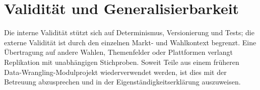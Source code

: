 \section{Validität und Generalisierbarkeit}
Die interne Validität stützt sich auf Determinismus, Versionierung und Tests; die
externe Validität ist durch den einzelnen Markt- und Wahlkontext begrenzt. Eine
Übertragung auf andere Wahlen, Themenfelder oder Plattformen verlangt Replikation
mit unabhängigen Stichproben. Soweit Teile aus einem früheren
Data-Wrangling-Modulprojekt wiederverwendet werden, ist dies mit der Betreuung
abzusprechen und in der Eigenständigkeitserklärung auszuweisen.
